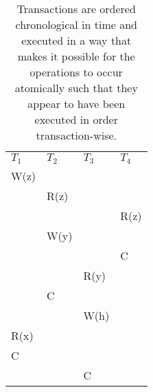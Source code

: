 \begin{table}[h]
    \begin{tabular}{l|l|l|l}
        $T_1$            & $T_2$            & $T_3$   & $T_4$   \\
        W(z) &      &      &      \\
        & R(z) &      &      \\
        &      &      & R(z) \\
        & W(y) &      &      \\
        &      &      & C    \\
        &      & R(y) &      \\
        & C    &      &      \\
        &      & W(h) &      \\
        R(x) &      &      &      \\
        C    &      &      &      \\
        &      & C    &
    \end{tabular}
    \caption{Transactions are ordered chronological in time and executed in a way that makes it possible for the operations to occur atomically such that they appear to have been executed in order transaction-wise. }
\end{table}